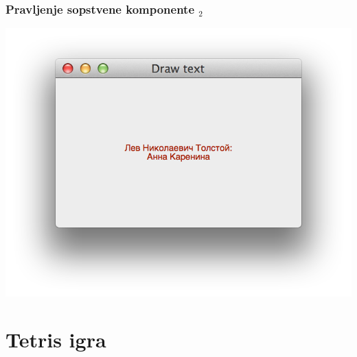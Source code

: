 \documentclass[utf8,compress,aspectratio=169]{beamer}
\begin{document}
\begin{frame}[fragile]
  \frametitle{Pravljenje sopstvene komponente $_2$}
\begin{center}
\includegraphics[scale=0.5]{pyqt17.png}
\end{center}
\end{frame}

\section[Tetris]{Tetris igra}
\end{document}
